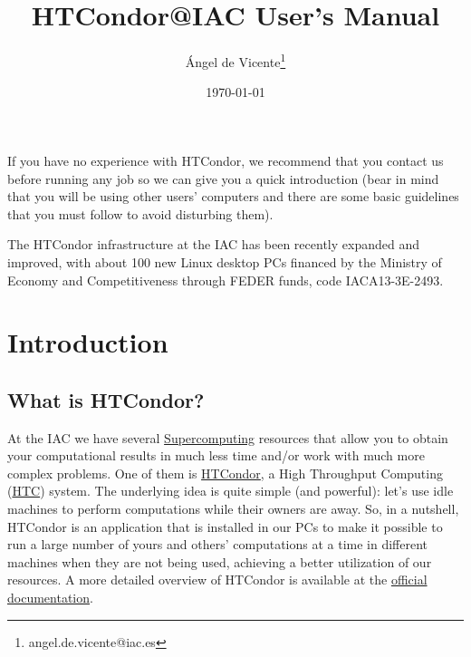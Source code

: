 \documentclass[a4paper,10pt]{article}
\author{Ángel de Vicente\thanks{angel.de.vicente@iac.es}}
\date{\today}
\title{HTCondor@IAC User's Manual}
\begin{document}
\maketitle
\setcounter{tocdepth}{4}
\tableofcontents

\small


\begin{mdframed}
\begin{warning}
If you have no experience with HTCondor, we recommend that you contact us before
running any job so we can give you a quick introduction (bear in mind that you
will be using other users' computers and there are some basic guidelines that
you must follow to avoid disturbing them).
\end{warning}
\end{mdframed}

\begin{mdframed}
\begin{note}
The HTCondor infrastructure at the IAC has been recently expanded and improved,
with about 100 new Linux desktop PCs financed by the Ministry of Economy and
Competitiveness through FEDER funds, code IACA13-3E-2493. 
\end{note}
\end{mdframed}

\section{Introduction}
\label{sec:org500d1d9}

\subsection{What is HTCondor?}
\label{sec:org58a8184}

At the IAC we have several \href{http://research.iac.es/sieinvens/SINFIN/Main/supercomputing.php}{Supercomputing} resources that allow you to obtain
your computational results in much less time and/or work with much more complex
problems. One of them is \href{http://research.cs.wisc.edu/htcondor/}{HTCondor}, a High Throughput Computing (\href{http://en.wikipedia.org/wiki/High-throughput\_computing}{HTC}) system. The
underlying idea is quite simple (and powerful): let's use idle machines to
perform computations while their owners are away. So, in a nutshell, HTCondor is
an application that is installed in our PCs to make it possible to run a large
number of yours and others' computations at a time in different machines when
they are not being used, achieving a better utilization of our resources. A more
detailed overview of HTCondor is available at the \href{https://htcondor.readthedocs.io/en/v10\_0/overview/index.html}{official documentation}.
\end{document}

